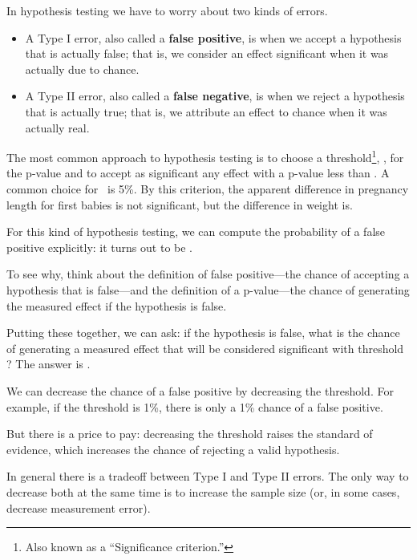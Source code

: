 \documentclass[12pt]{book}
\begin{document}
In hypothesis testing we have to worry about two kinds of errors.

\begin{itemize}

\item A Type I error, also called a {\bf false positive}, is when we
  accept a hypothesis that is actually false; that is, we consider an
  effect significant when it was actually due to chance.

\item A Type II error, also called a {\bf false negative}, is when we
  reject a hypothesis that is actually true; that is, we attribute an
  effect to chance when it was actually real.

\end{itemize}

The most common approach to hypothesis testing is to choose a
threshold\footnote{Also known as a ``Significance criterion.''},
\myalpha, for the p-value and to accept as significant any effect with
a p-value less than \myalpha.  A common choice for \myalpha~is 5\%.
By this criterion, the apparent difference in pregnancy length for
first babies is not significant, but the difference in weight is.

For this kind of hypothesis testing, we can compute the probability of
a false positive explicitly: it turns out to be \myalpha.

To see why, think about the definition of false positive---the chance
of accepting a hypothesis that is false---and the definition of a
p-value---the chance of generating the measured effect if the
hypothesis is false.

Putting these together, we can ask: if the hypothesis is false,
what is the chance of generating a measured effect that will be
considered significant with threshold \myalpha?  The answer is
\myalpha.

We can decrease the chance of a false positive by decreasing the
threshold.  For example, if the threshold is 1\%, there is only a 1\%
chance of a false positive.

But there is a price to pay: decreasing the threshold raises the
standard of evidence, which increases the chance of rejecting
a valid hypothesis.

In general there is a tradeoff between Type I and Type II errors.
The only way to decrease both at the same time is to increase the
sample size (or, in some cases, decrease measurement error).
\end{document}
